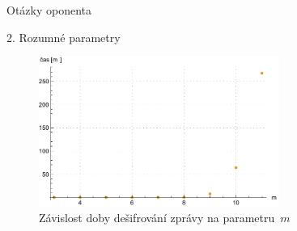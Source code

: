 \documentclass{beamer}
\begin{document}
\begin{frame}{Otázky oponenta}
    \begin{block}{2. Rozumné parametry}

        \begin{figure}
            \centering
            \includegraphics[width=0.7\textwidth]{../../implementace/grafy/listplot_mVelka_desifrovani.pdf}
            \caption[Časová složitost dešifrování]{
                Závislost doby dešifrování zprávy na parametru~$m$
            }
        \end{figure}

    \end{block}
\end{frame}

\end{document}
